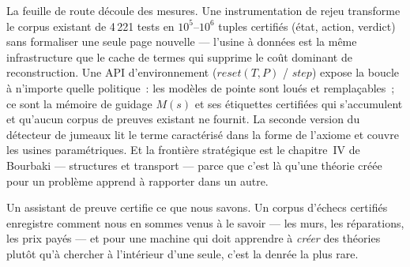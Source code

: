 \documentclass[11pt]{article}
\theoremstyle{remark}\newtheorem{example}{Exemple}
\begin{document}
La feuille de route découle des mesures. Une instrumentation de rejeu transforme le
corpus existant de 4\,221 tests en $10^5$--$10^6$ tuples certifiés (état, action,
verdict) sans formaliser une seule page nouvelle --- l'usine à données est la même
infrastructure que le cache de termes qui supprime le coût dominant de reconstruction.
Une API d'environnement ($\mathit{reset}(T,P)$ / $\mathit{step}$) expose la boucle à
n'importe quelle politique~: les modèles de pointe sont loués et remplaçables~; ce sont
la mémoire de guidage $M(s)$ et ses étiquettes certifiées qui s'accumulent et
qu'aucun corpus de preuves existant ne fournit. La seconde version du détecteur de
jumeaux lit le terme caractérisé dans la forme de l'axiome et couvre les usines
paramétriques. Et la frontière stratégique est le chapitre~IV de Bourbaki ---
structures et transport --- parce que c'est là qu'une théorie créée pour un problème
apprend à rapporter dans un autre.

Un assistant de preuve certifie ce que nous savons. Un corpus d'échecs certifiés
enregistre comment nous en sommes venus à le savoir --- les murs, les réparations, les
prix payés --- et pour une machine qui doit apprendre à \emph{créer} des théories
plutôt qu'à chercher à l'intérieur d'une seule, c'est la denrée la plus rare.



\end{document}
